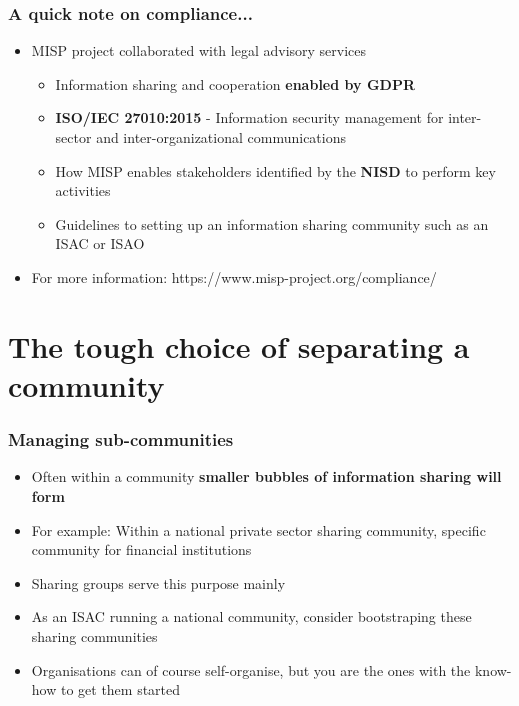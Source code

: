 \begin{frame}
	\frametitle{A quick note on compliance...}
	\begin{itemize}
		\item MISP project collaborated with legal advisory services
		\begin{itemize}
			\item Information sharing and cooperation \textbf{enabled by GDPR}
			\item \textbf{ISO/IEC 27010:2015} - Information security management for inter-sector and inter-organizational communications
			\item How MISP enables stakeholders identified by the \textbf{NISD} to perform key activities
			\item Guidelines to setting up an information sharing community such as an ISAC or ISAO
		\end{itemize}
		\item For more information: https://www.misp-project.org/compliance/
	\end{itemize}
\end{frame}

\section{The tough choice of separating a community}

\begin{frame}
	\frametitle{Managing sub-communities}
	\begin{itemize}
		\item Often within a community \textbf{smaller bubbles of information sharing will form}
		\item For example: Within a national private sector sharing community, specific community for financial institutions
		\item Sharing groups serve this purpose mainly
		\item As an ISAC running a national community, consider bootstraping these sharing communities
		\item Organisations can of course self-organise, but you are the ones with the know-how to get them started
	\end{itemize}
\end{frame}

